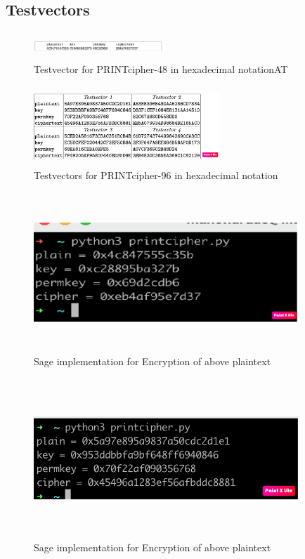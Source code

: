 \documentclass[journal=tosc,preprint]{iacrtrans}
\begin{document}
\subsection{Testvectors}
\begin{figure}[ht]
	\centering
	\includegraphics[height=1cm, width=5cm]{pics/testvector1.png}
	\caption{Testvector for PRINTcipher-48 in hexadecimal notationAT}
\end{figure}
\newpage
\begin{figure}[ht]
	\centering
	\includegraphics[height=3cm, width=7cm]{pics/testvector-2.png}
	\caption{Testvectors for PRINTcipher-96 in hexadecimal notation}
\end{figure}
\begin{figure}[ht]
	\centering
	\includegraphics[height=6cm, width=10cm]{pics/pic_1.png}
	\caption{Sage implementation for Encryption of above plaintext}
\end{figure}
\begin{figure}[ht]
	\centering
	\includegraphics[height=6cm, width=10cm]{pics/pic_2.png}
	\caption{Sage implementation for Encryption of above plaintext}
\end{figure}
\end{document}
